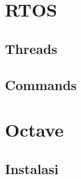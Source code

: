 \documentclass[11pt,fleqn]{book} %
\begin{document}
\chapter{RTOS}
\section{Threads}

\section{Commands}

\newpage
{} %
\chapter{Octave}
\section{Instalasi}
\end{document}
